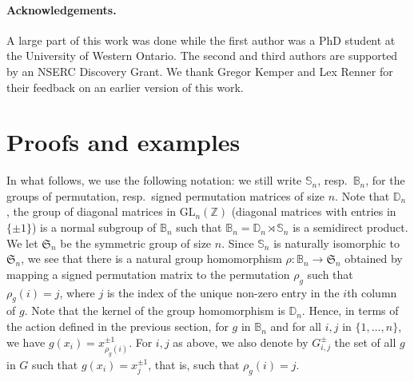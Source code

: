 \documentclass[12pt]{article}
\theoremstyle{plain}
\newcommand{\Z}{\ensuremath{\mathbb{Z}}}
\begin{document}
\paragraph{Acknowledgements.} A large part of this work was done while the first 
author was a PhD student at the University of Western Ontario. The second and 
third authors are supported by an NSERC Discovery Grant. We thank Gregor Kemper and 
Lex Renner for their feedback on an earlier version of this work.



\section{Proofs and examples}


In what follows, we use the following notation: we still write
$\mathbb{S}_n$, resp.\ $\mathbb{B}_n$, for the groups of permutation,
resp.\ signed permutation matrices of size $n$. Note that $\mathbb{D}_n$, the group of  diagonal matrices 
in $\mathrm{GL}_n(\Z)$ (diagonal matrices with entries in $\{\pm 1\}$) is a normal subgroup of $\mathbb{B}_n$
such that $\mathbb{B}_n=\mathbb{D}_n\rtimes \mathbb{S}_n$ is a semidirect product.
We let $\mathfrak{S}_n$ be the symmetric group of size $n$.  Since $\mathbb{S}_n$ is naturally isomorphic to 
$\mathfrak{S}_n$, we see that there is a natural group homomorphism  
$\rho: \mathbb{B}_n \to \mathfrak{S}_n$ 
obtained by mapping a signed permutation matrix to the permutation
$\rho_g$ such that $\rho_g(i)=j$, where $j$ is the index of the
unique non-zero entry in the $i$th column of $g$.  Note that the kernel of the group homomorphism is $\mathbb{D}_n$. %
Hence, in terms of
the action defined in the previous section, for $g$ in $\mathbb{B}_n$
and for all $i,j$ in $\{1,\dots,n\}$, we have $g(x_i) =
x_{\rho_g(i)}^{\pm 1}$.  For $i,j$ as above, we also denote by
$G^{\pm}_{i,j}$ the set of all $g$ in $G$ such that $g(x_i)=x^{\pm 1}_j$, that is,
such that $\rho_g(i)=j$.
\end{document}
